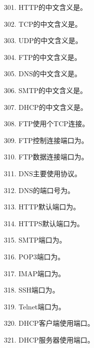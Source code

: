 301. HTTP的中文含义是\underline{\hspace{4cm}}。

302. TCP的中文含义是\underline{\hspace{4cm}}。

303. UDP的中文含义是\underline{\hspace{4cm}}。

304. FTP的中文含义是\underline{\hspace{4cm}}。

305. DNS的中文含义是\underline{\hspace{4cm}}。

306. SMTP的中文含义是\underline{\hspace{4cm}}。

307. DHCP的中文含义是\underline{\hspace{4cm}}。

308. FTP使用\underline{\hspace{2cm}}个TCP连接。

309. FTP控制连接端口为\underline{\hspace{2cm}}。

310. FTP数据连接端口为\underline{\hspace{2cm}}。

311. DNS主要使用\underline{\hspace{2cm}}协议。

312. DNS的端口号为\underline{\hspace{2cm}}。

313. HTTP默认端口为\underline{\hspace{2cm}}。

314. HTTPS默认端口为\underline{\hspace{2cm}}。

315. SMTP端口为\underline{\hspace{2cm}}。

316. POP3端口为\underline{\hspace{2cm}}。

317. IMAP端口为\underline{\hspace{2cm}}。

318. SSH端口为\underline{\hspace{2cm}}。

319. Telnet端口为\underline{\hspace{2cm}}。

320. DHCP客户端使用端口\underline{\hspace{2cm}}。

321. DHCP服务器使用端口\underline{\hspace{2cm}}。

